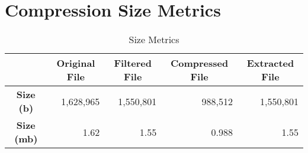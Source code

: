 \documentclass{article}
\begin{document}
    \section{Compression Size Metrics}
    \begin{table}[!h]
        \centering
        \begin{tabular}{c|r|r|r|r}
            & \multicolumn{1}{c}{\textbf{Original File}} & \multicolumn{1}{c}{\textbf{Filtered File}} & \multicolumn{1}{c}{\textbf{Compressed File}} & \multicolumn{1}{c}{\textbf{Extracted File}} \\\hline
            \textbf{Size (b)} & 1,628,965 & 1,550,801 & 988,512 & 1,550,801 \\\hline
            \textbf{Size (mb)} & 1.62 & 1.55 & 0.988 & 1.55  \\\hline
        \end{tabular}
        \caption{Size Metrics}\label{sizes}
    \end{table}
\end{document}
